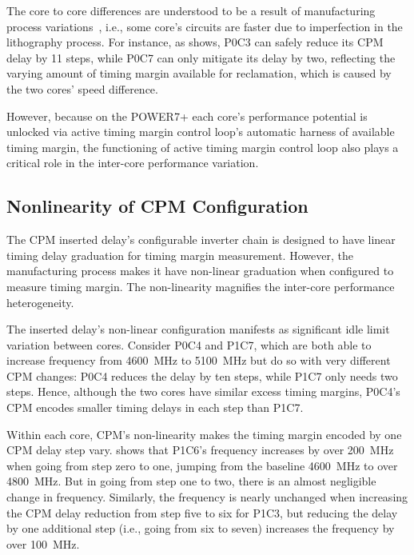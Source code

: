 The core to core differences are understood to be a result of manufacturing process variations~\cite{dighe2010within,rangan2011achieving}, i.e., some core's circuits are faster due to imperfection in the lithography process. For instance, as  shows, P0C3 can safely reduce its CPM delay by 11 steps, while P0C7 can only mitigate its delay by two, reflecting the varying amount of timing margin available for reclamation, which is caused by the two cores' speed difference.

However, because on the POWER7+ each core's performance potential is unlocked via active timing margin control loop's automatic harness of available timing margin, the functioning of active timing margin control loop also plays a critical role in the inter-core performance variation.

\subsection{Nonlinearity of CPM Configuration}
\label{sec:process:idle:cpm_variation}

The CPM inserted delay's configurable inverter chain is designed to have linear timing delay graduation for timing margin measurement. However, the manufacturing process makes it have non-linear graduation when configured to measure timing margin. The non-linearity magnifies the inter-core performance heterogeneity.

The inserted delay's non-linear configuration manifests as significant idle limit variation between cores. Consider P0C4 and P1C7, which are both able to increase frequency from 4600~MHz to 5100~MHz but do so with very different CPM changes: P0C4 reduces the delay by ten steps, while P1C7 only needs two steps. Hence, although the two cores have similar excess timing margins, P0C4's CPM encodes smaller timing delays in each step than P1C7. 

Within each core, CPM's non-linearity makes the timing margin encoded by one CPM delay step vary.  shows that P1C6's frequency increases by over 200~MHz when going from step zero to one, jumping from the baseline 4600~MHz to over 4800~MHz. But in going from step one to two, there is an almost negligible change in frequency. Similarly, the frequency is nearly unchanged when increasing the CPM delay reduction from step five to six for P1C3, but reducing the delay by one additional step (i.e., going from six to seven) increases the frequency by over 100~MHz.

